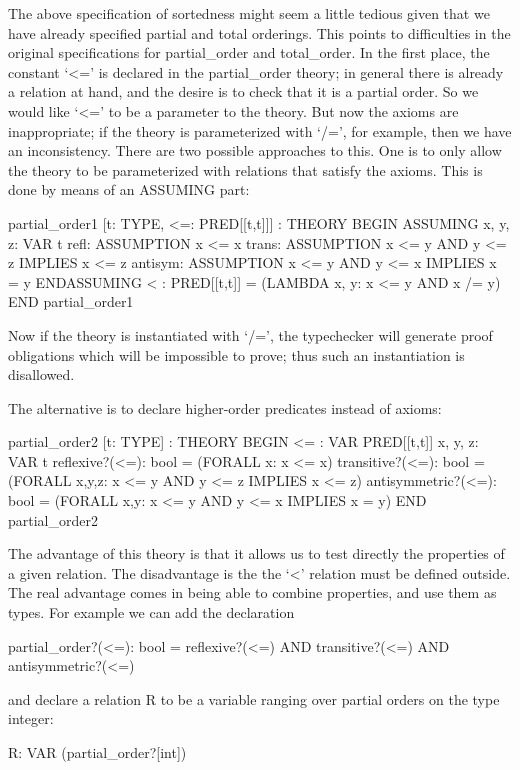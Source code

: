 The above specification of sortedness might seem a little tedious given
that we have already specified partial and total orderings.  This points
to difficulties in the original specifications for {\stt partial\_order}
and {\stt total\_order}.  In the first place, the constant `{\stt <=}'
is declared in the {\stt partial\_order} theory; in general there is
already a relation at hand, and the desire is to check that it is a
partial order.  So we would like `{\stt <=}' to be a parameter to the
theory.  But now the axioms are inappropriate; if the theory is
parameterized with `{\stt /=}', for example, then we have an
inconsistency.  There are two possible approaches to this.  One is to
only allow the theory to be parameterized with relations that satisfy
the axioms.  This is done by means of an {\stt ASSUMING} part:
\begin{pvsex}
  partial\_order1 [t: TYPE, <=: PRED[[t,t]]] : THEORY
   BEGIN
    ASSUMING
     x, y, z: VAR t
     refl: ASSUMPTION x <= x
     trans: ASSUMPTION  x <= y AND y <= z IMPLIES x <= z
     antisym: ASSUMPTION x <= y AND y <= x IMPLIES x = y
    ENDASSUMING
    < : PRED[[t,t]] = (LAMBDA x, y: x <= y AND x /= y)
   END partial\_order1
\end{pvsex}
%
Now if the theory is instantiated with `{\stt /=}', the typechecker will
generate proof obligations which will be impossible to prove; thus such
an instantiation is disallowed.

The alternative is to declare higher-order predicates instead of axioms:
\begin{pvsex}
  partial\_order2 [t: TYPE] : THEORY
   BEGIN
    <= : VAR PRED[[t,t]]
    x, y, z: VAR t
    reflexive?(<=): bool = (FORALL x: x <= x)
    transitive?(<=): bool =
      (FORALL x,y,z: x <= y AND y <= z IMPLIES x <= z)
    antisymmetric?(<=): bool =
      (FORALL x,y: x <= y AND y <= x IMPLIES x = y)
   END partial\_order2
\end{pvsex}
%
The advantage of this theory is that it allows us to test directly the
properties of a given relation.  The disadvantage is the the `{\stt <}'
relation must be defined outside.  The real advantage comes in being
able to combine properties, and use them as types. For example we can
add the declaration
\begin{pvsex}
  partial\_order?(<=): bool =
    reflexive?(<=) AND transitive?(<=) AND antisymmetric?(<=)
\end{pvsex}
%
and declare a relation {\stt R} to be a variable ranging over partial
orders on the type integer:
\begin{pvsex}
  R: VAR (partial\_order?[int])
\end{pvsex}

